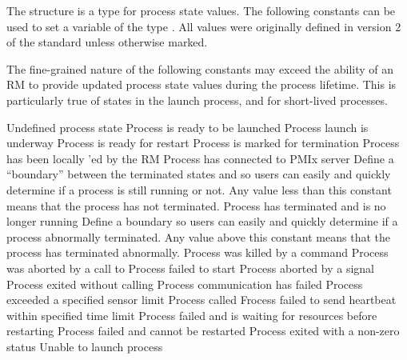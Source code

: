 The  structure is a  type for process state values. The following constants can be used to set a variable of the type . All values were originally defined in version 2 of the standard unless otherwise marked.

\adviceuserstart
The fine-grained nature of the following constants may exceed the ability of an \ac{RM} to provide updated process state values during the process lifetime. This is particularly true of states in the launch process, and for short-lived processes.
\adviceuserend

\begin{constantdesc}
%
Undefined process state
%
Process is ready to be launched
%
Process launch is underway
%
Process is ready for restart
%
Process is marked for termination
%
Process has been locally 'ed by the \ac{RM}
%
Process has connected to PMIx server
%
Define a ``boundary'' between the terminated states and  so users can easily and quickly determine if a process is still running or not.
Any value less than this constant means that the process has not terminated.
%
Process has terminated and is no longer running
%
Define a boundary so users can easily and quickly determine if a process abnormally terminated.
Any value above this constant means that the process has terminated abnormally.
%
Process was killed by a command
%
Process was aborted by a call to 
%
Process failed to start
%
Process aborted by a signal
%
Process exited without calling 
%
Process communication has failed
%
Process exceeded a specified sensor limit
%
Process called 
%
Frocess failed to send heartbeat within specified time limit
%
Process failed and is waiting for resources before restarting
%
Process failed and cannot be restarted
%
Process exited with a non-zero status
%
Unable to launch process
%
\end{constantdesc}


